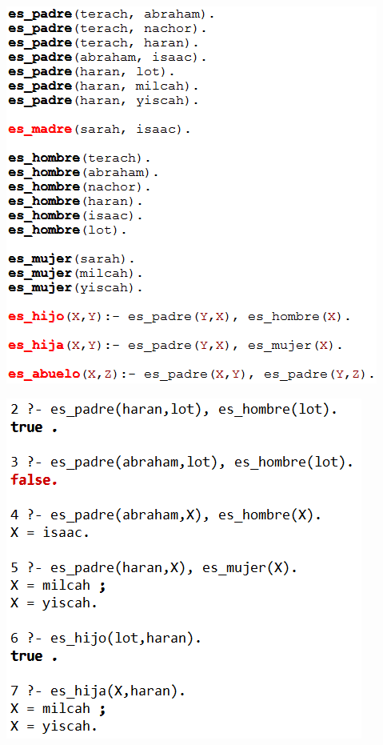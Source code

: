 \begin{enumerate}[1.]
\begin{center}
\includegraphics[scale=0.50]{./Imagenes/img10.png} 
\end{center}

\begin{center}
\includegraphics[scale=0.50]{./Imagenes/img11.png} 
\end{center}



\end{enumerate}
